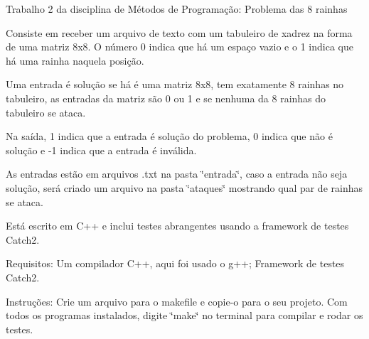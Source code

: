 Trabalho 2 da disciplina de Métodos de Programação\+: Problema das 8 rainhas

Consiste em receber um arquivo de texto com um tabuleiro de xadrez na forma de uma matriz 8x8. O número 0 indica que há um espaço vazio e o 1 indica que há uma rainha naquela posição.

Uma entrada é solução se há é uma matriz 8x8, tem exatamente 8 rainhas no tabuleiro, as entradas da matriz são 0 ou 1 e se nenhuma da 8 rainhas do tabuleiro se ataca.

Na saída, 1 indica que a entrada é solução do problema, 0 indica que não é solução e -\/1 indica que a entrada é inválida.

As entradas estão em arquivos .txt na pasta \char`\"{}entrada\char`\"{}, caso a entrada não seja solução, será criado um arquivo na pasta \char`\"{}ataques\char`\"{} mostrando qual par de rainhas se ataca.

Está escrito em C++ e inclui testes abrangentes usando a framework de testes Catch2.

Requisitos\+: Um compilador C++, aqui foi usado o g++; Framework de testes Catch2.

Instruções\+: Crie um arquivo para o makefile e copie-\/o para o seu projeto. Com todos os programas instalados, digite \char`\"{}make\char`\"{} no terminal para compilar e rodar os testes. ~\newline
 